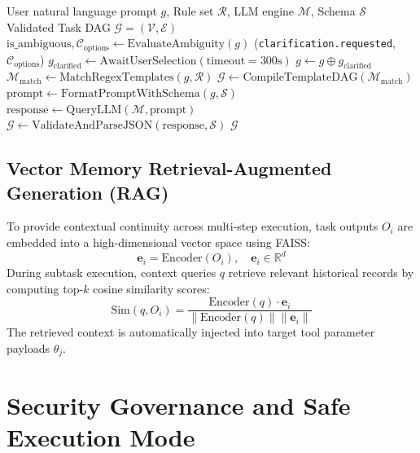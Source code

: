 \documentclass[conference]{IEEEtran}
\begin{document}
\begin{algorithm}[htbp]
\caption{Interactive Goal Clarification & Hybrid Decomposition}
\label{alg:clarification}
\begin{algorithmic}[1]
\REQUIRE User natural language prompt $g$, Rule set $\mathcal{R}$, LLM engine $\mathcal{M}$, Schema $\mathcal{S}$
\ENSURE Validated Task DAG $\mathcal{G} = (\mathcal{V}, \mathcal{E})$
\STATE $\text{is\_ambiguous}, \mathcal{C}_{\text{options}} \leftarrow \text{EvaluateAmbiguity}(g)$
    \STATE {}(\texttt{clarification.requested}, $\mathcal{C}_{\text{options}}$)
    \STATE $g_{\text{clarified}} \leftarrow \text{AwaitUserSelection}(\text{timeout}=300\text{s})$
    \STATE $g \leftarrow g \oplus g_{\text{clarified}}$
\ENDIF
\STATE $\mathcal{M}_{\text{match}} \leftarrow \text{MatchRegexTemplates}(g, \mathcal{R})$
    \STATE $\mathcal{G} \leftarrow \text{CompileTemplateDAG}(\mathcal{M}_{\text{match}})$
\ELSE
    \STATE $\text{prompt} \leftarrow \text{FormatPromptWithSchema}(g, \mathcal{S})$
    \STATE $\text{response} \leftarrow \text{QueryLLM}(\mathcal{M}, \text{prompt})$
    \STATE $\mathcal{G} \leftarrow \text{ValidateAndParseJSON}(\text{response}, \mathcal{S})$
\ENDIF
\RETURN $\mathcal{G}$
\end{algorithmic}
\end{algorithm}

\subsection{Vector Memory Retrieval-Augmented Generation (RAG)}
To provide contextual continuity across multi-step execution, task outputs $O_i$ are embedded into a high-dimensional vector space using FAISS:
\begin{equation}
\mathbf{e}_i = \text{Encoder}(O_i), \quad \mathbf{e}_i \in \mathbb{R}^d
\end{equation}
During subtask execution, context queries $q$ retrieve relevant historical records by computing top-$k$ cosine similarity scores:
\begin{equation}
\text{Sim}(q, O_i) = \frac{\text{Encoder}(q) \cdot \mathbf{e}_i}{\|\text{Encoder}(q)\| \|\mathbf{e}_i\|}
\end{equation}
The retrieved context is automatically injected into target tool parameter payloads $\theta_j$.

\section{Security Governance and Safe Execution Mode}
\label{sec:security}
\end{document}
